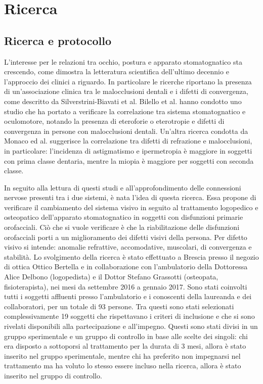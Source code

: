 \chapter{Ricerca}
\section{Ricerca e protocollo}

L’interesse per le relazioni tra occhio, postura e apparato stomatognatico sta crescendo, come dimostra la letteratura
scientifica dell’ultimo decennio e l’approccio dei clinici a riguardo. In particolare le ricerche riportano la presenza di
un’associazione clinica tra le malocclusioni dentali e i difetti di convergenza, come descritto da Silverstrini-Biavati et al.
Bilello et al. hanno condotto uno studio che ha portato a verificare la correlazione tra sistema stomatognatico e
oculomotore, notando la presenza di eteroforie o eterotropie e difetti di convergenza in persone con malocclusioni
dentali. Un’altra ricerca condotta da Monaco ed al. suggerisce la correlazione tra difetti di refrazione e malocclusioni,
in particolare: l’incidenza di astigmatismo e ipermetropia è maggiore in soggetti con prima classe dentaria, mentre la
miopia è maggiore per soggetti con seconda classe.

In seguito alla lettura di questi studi e all’approfondimento delle connessioni nervose presenti tra i due sistemi, è nata l’idea di questa ricerca. Essa propone di verificare il cambiamento del sistema visivo in seguito al trattamento logopedico e osteopatico dell’apparato stomatognatico in soggetti con disfunzioni primarie orofacciali. Ciò che si vuole verificare è che la riabilitazione delle disfunzioni orofacciali porti a un miglioramento dei difetti visivi della persona. 
Per difetto visivo si intende: anomalie refrattive, accomodative, muscolari, di convergenza e stabilità. Lo svolgimento della ricerca è stato effettuato a Brescia presso il negozio di ottica Ottico Bertella e in collaborazione con l’ambulatorio della Dottoressa Alice Delbono (logopedista) e il Dottor Stefano Grassotti (osteopata, fisioterapista), nei mesi da settembre 2016 a gennaio 2017. Sono stati coinvolti tutti i soggetti affluenti presso l’ambulatorio e i conoscenti della laureanda e dei collaboratori, per un totale di 93 persone. Tra questi sono stati selezionati complessivamente 19 soggetti che rispettavano i criteri di inclusione e che si sono rivelati disponibili alla partecipazione e all’impegno. Questi sono stati divisi in un gruppo sperimentale e un gruppo di controllo in base alle scelte dei singoli: chi era disposto a sottoporsi al trattamento per la durata di 3 mesi, allora è stato inserito nel gruppo sperimentale, mentre chi ha preferito non impegnarsi nel trattamento ma ha voluto lo stesso essere incluso nella ricerca, allora è stato inserito nel gruppo di controllo.

